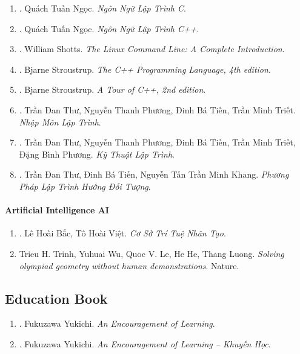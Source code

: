\documentclass{article}
\begin{document}
\begin{enumerate}
	\item \cite{Ngoc_C}. Quách Tuấn Ngọc. {\it Ngôn Ngữ Lập Trình C}.\hfill{\sf[reading]}
	\item \cite{Ngoc_C++}. Quách Tuấn Ngọc. {\it Ngôn Ngữ Lập Trình C++}.\hfill{\sf[done]}
	\item \cite{Shotts2019}. William Shotts. {\it The Linux Command Line: A Complete Introduction}.\hfill{\sf[reading]}
	\item \cite{Stroustrup2013}. Bjarne Stroustrup. {\it The C++ Programming Language, 4th edition}.\hfill{\sf[reading]}
	\item \cite{Stroustrup2018}. Bjarne Stroustrup. {\it A Tour of C++, 2nd edition}.\hfill{\sf[reading]}
	\item \cite{Thu_Phuong_Tien_Triet_NMLT}. Trần Đan Thư, Nguyễn Thanh Phương, Đinh Bá Tiến, Trần Minh Triết. {\it Nhập Môn Lập Trình}.\hfill{\sf[reading]}
	\item \cite{Thu_Phuong_Tien_Triet_Phuong_KTLT}. Trần Đan Thư, Nguyễn Thanh Phương, Đinh Bá Tiến, Trần Minh Triết, Đặng Bình Phương. {\it Kỹ Thuật Lập Trình}.\hfill{\sf[reading]}
	\item \cite{Thu_Tien_Khang_PPLTHDT}. Trần Đan Thư, Đinh Bá Tiến, Nguyễn Tấn Trần Minh Khang. {\it Phương Pháp Lập Trình Hướng Đối Tượng}.\hfill{\sf[reading]}
\end{enumerate}

\paragraph{Artificial Intelligence AI}

\begin{enumerate}
	\item \cite{Bac_Viet_AI}. Lê Hoài Bắc, Tô Hoài Việt. {\it Cơ Sở Trí Tuệ Nhân Tạo}.\hfill{\sf[done]}
	\item Trieu H. Trinh, Yuhuai Wu, Quoc V. Le, He He, Thang Luong. {\it Solving olympiad geometry without human demonstrations}. Nature.\hfill{\sf[reading]}
\end{enumerate}


\subsection{Education Book}

\begin{enumerate}
	\item \cite{Yukichi_encourage_learn}. {\sc Fukuzawa Yukichi}. {\it An Encouragement of Learning}.\hfill{\sf[reading]}
	\item \cite{Yukichi_khuyen_hoc}. {\sc Fukuzawa Yukichi}. {\it An Encouragement of Learning -- Khuyến Học}.\hfill{\sf[done]}
\end{enumerate}
\end{document}
